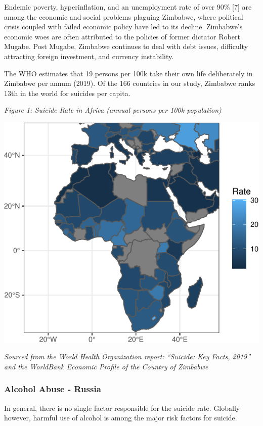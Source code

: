 \documentclass[]{article}
\begin{document}
Endemic poverty, hyperinflation, and an unemployment rate of over 90\%
{[}7{]} are among the economic and social problems plaguing Zimbabwe,
where political crisis coupled with failed economic policy have led to
its decline. Zimbabwe's economic woes are often attributed to the
policies of former dictator Robert Mugabe. Post Mugabe, Zimbabwe
continues to deal with debt issues, difficulty attracting foreign
investment, and currency instability.

The WHO estimates that 19 persons per 100k take their own life
deliberately in Zimbabwe per annum (2019). Of the 166 countries in our
study, Zimbabwe ranks 13th in the world for suicides per capita.

\emph{Figure 1: Suicide Rate in Africa (annual persons per 100k
population)}

\begin{center}\includegraphics{Project_Report_files/figure-latex/africa_map_plot-1} \end{center}

\emph{Sourced from the World Health Organization report: ``Suicide: Key
Facts, 2019'' and the WorldBank Economic Profile of the Country of
Zimbabwe}

\subsubsection{Alcohol Abuse - Russia}\label{alcohol-abuse---russia}

In general, there is no single factor responsible for the suicide rate.
Globally however, harmful use of alcohol is among the major risk factors
for suicide.
\end{document}

